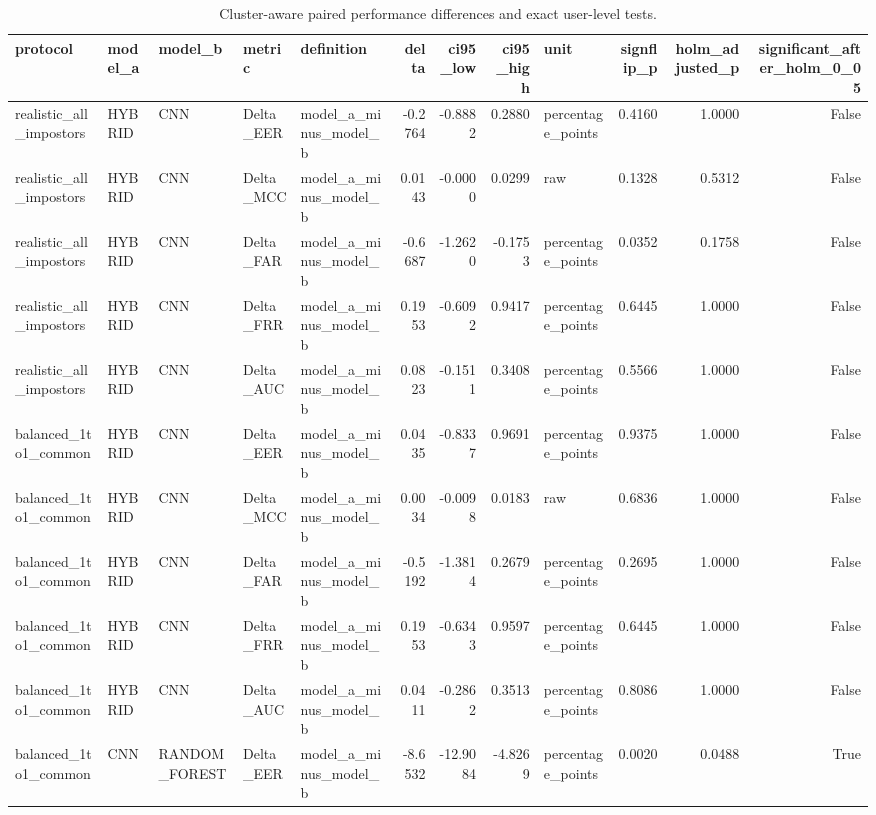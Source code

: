 \begin{table}
\caption{Cluster-aware paired performance differences and exact user-level tests.}
\label{tab:stage51_deltas}
\begin{tabular}{lllllrrrlrrr}
\toprule
protocol & model\_a & model\_b & metric & definition & delta & ci95\_low & ci95\_high & unit & signflip\_p & holm\_adjusted\_p & significant\_after\_holm\_0\_05 \\
\midrule
realistic\_all\_impostors & HYBRID & CNN & Delta\_EER & model\_a\_minus\_model\_b & -0.2764 & -0.8882 & 0.2880 & percentage\_points & 0.4160 & 1.0000 & False \\
realistic\_all\_impostors & HYBRID & CNN & Delta\_MCC & model\_a\_minus\_model\_b & 0.0143 & -0.0000 & 0.0299 & raw & 0.1328 & 0.5312 & False \\
realistic\_all\_impostors & HYBRID & CNN & Delta\_FAR & model\_a\_minus\_model\_b & -0.6687 & -1.2620 & -0.1753 & percentage\_points & 0.0352 & 0.1758 & False \\
realistic\_all\_impostors & HYBRID & CNN & Delta\_FRR & model\_a\_minus\_model\_b & 0.1953 & -0.6092 & 0.9417 & percentage\_points & 0.6445 & 1.0000 & False \\
realistic\_all\_impostors & HYBRID & CNN & Delta\_AUC & model\_a\_minus\_model\_b & 0.0823 & -0.1511 & 0.3408 & percentage\_points & 0.5566 & 1.0000 & False \\
balanced\_1to1\_common & HYBRID & CNN & Delta\_EER & model\_a\_minus\_model\_b & 0.0435 & -0.8337 & 0.9691 & percentage\_points & 0.9375 & 1.0000 & False \\
balanced\_1to1\_common & HYBRID & CNN & Delta\_MCC & model\_a\_minus\_model\_b & 0.0034 & -0.0098 & 0.0183 & raw & 0.6836 & 1.0000 & False \\
balanced\_1to1\_common & HYBRID & CNN & Delta\_FAR & model\_a\_minus\_model\_b & -0.5192 & -1.3814 & 0.2679 & percentage\_points & 0.2695 & 1.0000 & False \\
balanced\_1to1\_common & HYBRID & CNN & Delta\_FRR & model\_a\_minus\_model\_b & 0.1953 & -0.6343 & 0.9597 & percentage\_points & 0.6445 & 1.0000 & False \\
balanced\_1to1\_common & HYBRID & CNN & Delta\_AUC & model\_a\_minus\_model\_b & 0.0411 & -0.2862 & 0.3513 & percentage\_points & 0.8086 & 1.0000 & False \\
balanced\_1to1\_common & CNN & RANDOM\_FOREST & Delta\_EER & model\_a\_minus\_model\_b & -8.6532 & -12.9084 & -4.8269 & percentage\_points & 0.0020 & 0.0488 & True \\

\end{tabular}
\end{table}
